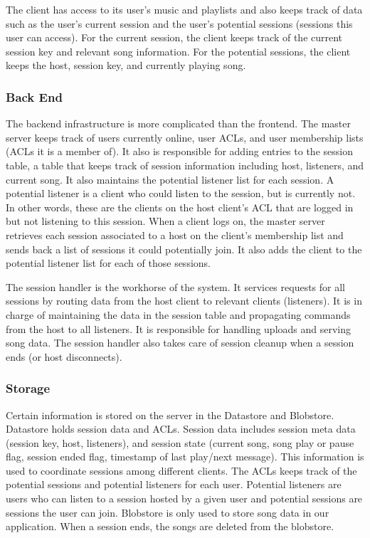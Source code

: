 The client has access to its user's music and playlists and 
also keeps track of data such as the user's current 
session and the user's potential sessions (sessions 
this user can access). For the current session, the 
client keeps track of the current session key and relevant song information. 
For the potential sessions, the client keeps the host, 
session key, and currently playing song.

\subsubsection{Back End}
\label{sec:backend}
The backend infrastructure is more complicated than 
the frontend. The master server keeps track of users 
currently online, user ACLs, and user membership lists 
(ACLs it is a member of). It also is responsible for 
adding entries to the session table, a table that keeps track
of session information including host, listeners, and current song. 
It also maintains the potential listener
list for each session. A potential listener is a client 
who could listen to the session, but is currently not. 
In other words, these are the clients on the host client's 
ACL that are logged in but not listening to this 
session. When a client logs on, the master server retrieves each 
session associated to a host on the client's 
membership list and sends back a list of sessions it could
potentially join. It also adds the client to the potential
listener list for each of those sessions.

The session handler is the workhorse of the system. It 
services requests for all sessions by routing data from the 
host client to relevant clients (listeners). It is in charge 
of maintaining the data in the session table and propagating 
commands from the host to all listeners. It is responsible
for handling uploads and serving song data. The session handler 
also takes care of session cleanup when a session ends (or 
host disconnects). 

\subsubsection{Storage}
\label{sec:storage}
Certain information is stored on the server in the Datastore and Blobstore.
Datastore holds session data and ACLs. 
Session data includes session meta data (session key, host, listeners), 
and session state (current song, song play or pause flag, session ended flag, 
timestamp of last play/next message). This information is used to coordinate
sessions among different clients. The ACLs keeps track of the potential
sessions and potential listeners for each user. Potential listeners are 
users who can listen to a session hosted by a given user and potential sessions
are sessions the user can join. Blobstore is only used 
to store song data in our application. When a session ends, the songs are deleted 
from the blobstore.

